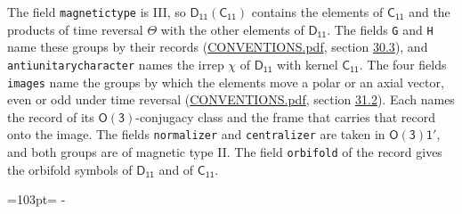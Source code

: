 \documentclass[10pt,a4paper]{article}
\newcommand{\needspace}[1]{\par\penalty-100\begingroup\dimen0=#1\relax\dimen2=\pagegoal
  \advance\dimen2-\pagetotal\ifdim\dimen0>\dimen2\relax\ifdim\dimen2>0pt\vfil\break\fi\fi
  \endgroup}
\numberwithin{equation}{section}
\newcommand{\grp}[1]{\mathsf{#1}}
\begin{document}
The field \texttt{magnetictype} is III, so $\grp{D_{11}}(\grp{C_{11}})$ contains the elements of $\grp{C_{11}}$ and the products of time reversal $\varTheta$ with the other elements of $\grp{D_{11}}$. The fields \texttt{G} and \texttt{H} name these groups by their records (\href{../../CONVENTIONS.pdf}{CONVENTIONS.pdf}, section \href{../../CONVENTIONS.pdf\#conv.30.3}{30.3}), and \texttt{antiunitarycharacter} names the irrep $\chi$ of $\grp{D_{11}}$ with kernel $\grp{C_{11}}$. The four fields \texttt{images} name the groups by which the elements move a polar or an axial vector, even or odd under time reversal (\href{../../CONVENTIONS.pdf}{CONVENTIONS.pdf}, section \href{../../CONVENTIONS.pdf\#conv.31.2}{31.2}). Each names the record of its $\grp{O(3)}$-conjugacy class and the frame that carries that record onto the image. The fields \texttt{normalizer} and \texttt{centralizer} are taken in $\grp{O(3)1'}$, and both groups are of magnetic type II. The field \texttt{orbifold} of the record gives the orbifold symbols of $\grp{D_{11}}$ and of $\grp{C_{11}}$.
\needspace{103pt}
\end{document}

